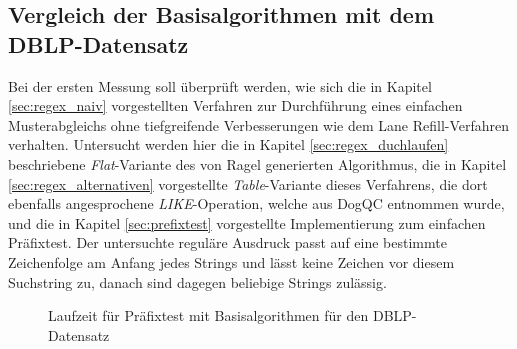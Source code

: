 \subsection{Vergleich der Basisalgorithmen mit dem DBLP-Datensatz}
\label{sec:regex_evaluation_beobachtung_1}

Bei der ersten Messung soll überprüft werden, wie sich die in Kapitel \ref{sec:regex_naiv} vorgestellten Verfahren zur Durchführung eines einfachen Musterabgleichs ohne tiefgreifende Verbesserungen wie dem Lane Refill-Verfahren verhalten.
Untersucht werden hier die in Kapitel \ref{sec:regex_duchlaufen} beschriebene \emph{Flat}-Variante des von Ragel generierten Algorithmus, die in Kapitel \ref{sec:regex_alternativen} vorgestellte \emph{Table}-Variante dieses Verfahrens, die dort ebenfalls angesprochene \emph{LIKE}-Operation, welche aus DogQC entnommen wurde, und die in Kapitel \ref{sec:prefixtest} vorgestellte Implementierung zum einfachen Präfixtest.
Der untersuchte reguläre Ausdruck passt auf eine bestimmte Zeichenfolge am Anfang jedes Strings und lässt keine Zeichen vor diesem Suchstring zu, danach sind dagegen beliebige Strings zulässig. 

\begin{figure}[ht]
	\centering
	\caption{Laufzeit für Präfixtest mit Basisalgorithmen für den DBLP-Datensatz}
	\label{fig:regex_dblpANY_no_buffer}
\end{figure}

